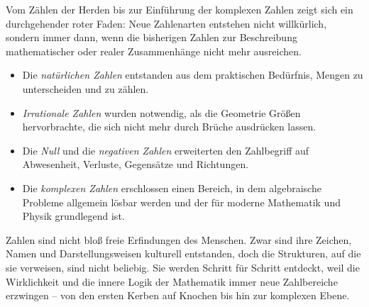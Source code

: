 Vom Zählen der Herden bis zur Einführung der komplexen Zahlen
zeigt sich ein durchgehender roter Faden:
Neue Zahlenarten entstehen nicht willkürlich,
sondern immer dann, wenn die bisherigen Zahlen
zur Beschreibung mathematischer oder realer Zusammenhänge nicht mehr ausreichen.

\begin{itemize}
	\item Die \emph{natürlichen Zahlen}
	entstanden aus dem praktischen Bedürfnis, Mengen zu unterscheiden und zu zählen.
	\item \emph{Irrationale Zahlen}
	wurden notwendig, als die Geometrie Größen hervorbrachte,
	die sich nicht mehr durch Brüche ausdrücken lassen.
	\item Die \emph{Null}
	und die \emph{negativen Zahlen}
	erweiterten den Zahlbegriff auf Abwesenheit, Verluste, Gegensätze und Richtungen.
	\item Die \emph{komplexen Zahlen}
	erschlossen einen Bereich, in dem algebraische Probleme
	allgemein lösbar werden und der für moderne Mathematik und Physik grundlegend ist.
\end{itemize}

\begin{NoteBox}
	Zahlen sind nicht bloß freie Erfindungen des Menschen.
	Zwar sind ihre Zeichen, Namen und Darstellungsweisen kulturell entstanden,
	doch die Strukturen, auf die sie verweisen, sind nicht beliebig.
	Sie werden Schritt für Schritt entdeckt,
	weil die Wirklichkeit und die innere Logik der Mathematik
	immer neue Zahlbereiche erzwingen --
	von den ersten Kerben auf Knochen
	bis hin zur komplexen Ebene.
	\label{box:universelle}
\end{NoteBox}